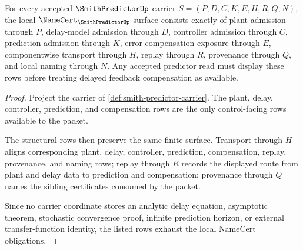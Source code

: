 \begin{theorem}
\label{thm:smith-predictor-namecert-obligations}
For every accepted $\SmithPredictorUp$ carrier $S=(P,D,C,K,E,H,R,Q,N)$, the local $\NameCert_{\SmithPredictorUp}$ surface consists exactly of plant admission through $P$, delay-model admission through $D$, controller admission through $C$, prediction admission through $K$, error-compensation exposure through $E$, componentwise transport through $H$, replay through $R$, provenance through $Q$, and local naming through $N$. Any accepted predictor read must display these rows before treating delayed feedback compensation as available.
\end{theorem}
\begin{proof}
Project the carrier of \autoref{def:smith-predictor-carrier}. The plant, delay, controller, prediction, and compensation rows are the only control-facing rows available to the packet.

The structural rows then preserve the same finite surface. Transport through $H$ aligns corresponding plant, delay, controller, prediction, compensation, replay, provenance, and naming rows; replay through $R$ records the displayed route from plant and delay data to prediction and compensation; provenance through $Q$ names the sibling certificates consumed by the packet.

Since no carrier coordinate stores an analytic delay equation, asymptotic theorem, stochastic convergence proof, infinite prediction horizon, or external transfer-function identity, the listed rows exhaust the local NameCert obligations.
\end{proof}

